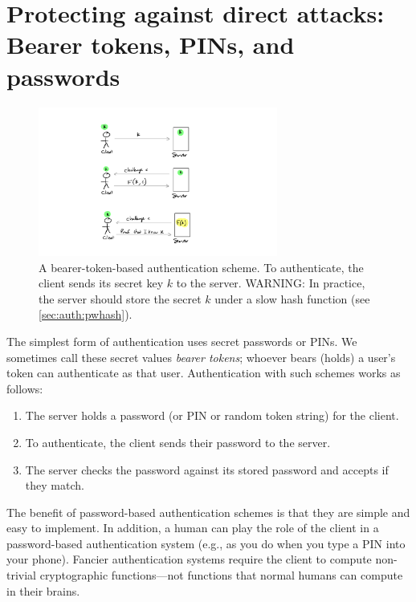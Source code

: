 \section{Protecting against direct attacks:\\ Bearer tokens, PINs, and passwords}

\begin{figure}
\centering
\includegraphics[width=0.7\textwidth]{figs/auth-direct.pdf}
\caption{A bearer-token-based authentication scheme.
To authenticate, the client sends its secret key
$k$ to the server.
{\color{red} WARNING: In practice, the server should store the secret $k$ under
a slow hash function (see \cref{sec:auth:pwhash}).}
}\label{fig:auth-direct}
\end{figure}

The simplest form of authentication uses secret
passwords or PINs. We sometimes call these secret values
\emph{bearer tokens}; whoever bears (holds)
a user's token can authenticate as that user.
Authentication with such schemes works as follows:
\begin{enumerate}
    \item The server holds a password (or PIN or random token string) for the client.
    \item To authenticate, the client sends their password to the server. 
    \item The server checks the password against
          its stored password and accepts if they match.
\end{enumerate}

The benefit of password-based authentication
schemes is that they are simple and easy to implement.
In addition, a human can play the role of the client
in a password-based authentication system (e.g., as you do
when you type a PIN into your phone).
Fancier authentication systems require the client to compute
non-trivial cryptographic functions---not functions that normal
humans can compute in their brains.

